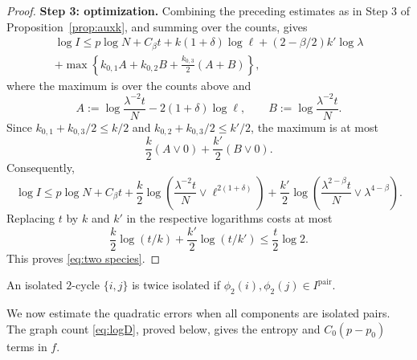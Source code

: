 \documentclass[a4paper,10pt,leqno]{amsart}
\numberwithin{equation}{section}
\def\pair{\mathrm{pair}}
\begin{document}
\begin{proof}
  \noindent
  \textbf{Step 3: optimization.}
  Combining the preceding estimates as in Step 3 of Proposition~\ref{prop:auxk}, and summing over the counts, gives
  \begin{multline*}
    \log I\le p\log N+C_\beta t
    +k(1+\delta)\log\ell+(2-\beta/2)k'\log\lambda\\
    +\max\left\{k_{0,1}A+k_{0,2}B+\frac{k_{0,3}}2(A+B)\right\},
  \end{multline*}
  where the maximum is over the counts above and
  \[
    A:=\log\frac{\lambda^{-2}t}{N}-2(1+\delta)\log\ell,
    \qquad B:=\log\frac{\lambda^{-2}t}{N}.
  \]
  Since $k_{0,1}+k_{0,3}/2\le k/2$ and $k_{0,2}+k_{0,3}/2\le k'/2$, the maximum is at most
  \[
    \frac{k}{2}(A\vee0)+\frac{k'}{2}(B\vee0).
  \]
  Consequently,
  \begin{equation*}
    \log I\le p\log N+C_\beta t
    +\frac{k}{2}\log\left(\frac{\lambda^{-2}t}{N}\vee\ell^{2(1+\delta)}\right)
    +\frac{k'}{2}\log\left(\frac{\lambda^{2-\beta}t}{N}\vee\lambda^{4-\beta}\right).
  \end{equation*}
  Replacing $t$ by $k$ and $k'$ in the respective logarithms costs at most
  \[
    \frac{k}{2}\log(t/k)+\frac{k'}{2}\log(t/k')\le\frac{t}{2}\log2.
  \]
  This proves \eqref{eq:two species}.
\end{proof}

An isolated $2$-cycle $\{i,j\}$ is twice isolated if $\phi_2(i),\phi_2(j)\in I^\pair$.

We now estimate the quadratic errors when all components are isolated pairs. The graph count \eqref{eq:logD}, proved below, gives the entropy and $C_0(p-p_0)$ terms in $f$.
\end{document}

